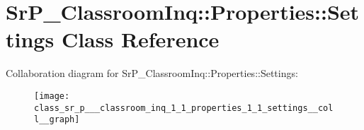 \hypertarget{class_sr_p___classroom_inq_1_1_properties_1_1_settings}{
\section{\-Sr\-P\-\_\-\-Classroom\-Inq\-:\-:\-Properties\-:\-:\-Settings \-Class \-Reference}
\label{class_sr_p___classroom_inq_1_1_properties_1_1_settings}
}


\-Collaboration diagram for \-Sr\-P\-\_\-\-Classroom\-Inq\-:\-:\-Properties\-:\-:\-Settings\-:
\nopagebreak
\begin{figure}[H]
\begin{center}
\leavevmode
\texttt{[image: class\_sr\_p\_\_\_classroom\_inq\_1\_1\_properties\_1\_1\_settings\_\_coll\_\_graph]}
\end{center}
\end{figure}
